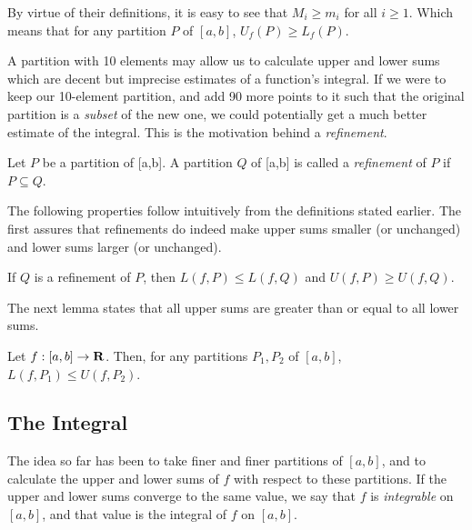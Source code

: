\documentclass{article}
\begin{document}
      \begin{remark}
        By virtue of their definitions, it is easy to see that \(M_i \geq m_i\) for all \(i \geq 1\). Which means that for any partition \(P\) of \([a,b]\), \(U_f(P) \geq L_f(P)\).
      \end{remark}

      A partition with 10 elements may allow us to calculate upper and lower sums which are decent but imprecise estimates of a function's integral. If we were to keep our 10-element partition, and add 90 more points to it such that the original partition is a \emph{subset} of the new one, we could potentially get a much better estimate of the integral. This is the motivation behind a \emph{refinement}.

      \begin{defi}[Refinements]
        Let \(P\) be a partition of [a,b]. A partition \(Q\) of [a,b] is called a \emph{refinement} of \(P\) if \(P \subseteq Q\).
      \end{defi}

      The following properties follow intuitively from the definitions stated earlier. The first assures that refinements do indeed make upper sums smaller (or unchanged) and lower sums larger (or unchanged).
      
      \begin{lemma}
        If \(Q\) is a refinement of \(P\), then \(L(f,P) \leq L(f,Q)\) and \(U(f,P) \geq U(f,Q)\).
      \end{lemma}

      The next lemma states that all upper sums are greater than or equal to all lower sums. 

      \begin{lemma}
        Let \(f:[a,b] \to \mathbf{R}\). Then, for any partitions \(P_1, P_2\) of \([a,b]\), \(L(f,P_1) \leq U(f,P_2)\).
      \end{lemma}




  \subsection{The Integral}
  The idea so far has been to take finer and finer partitions of \([a,b]\), and to calculate the upper and lower sums of \(f\) with respect to these partitions. If the upper and lower sums converge to the same value, we say that \(f\) is \emph{integrable} on \([a,b]\), and that value is the integral of \(f\) on \([a,b]\).
\end{document}
